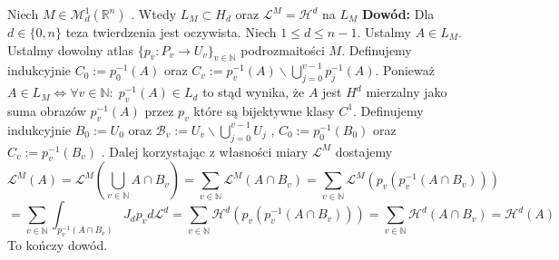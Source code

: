 \begin{tw}
	Niech $M \in \mathcal{M}^1_d(\mathbb{R}^n)$ . Wtedy $L_M \subset H_d$ oraz $\mathcal{L}^M = \mathcal{H}^d$ na $L_M$ 
	\newline\newline
	\textbf{Dowód:}\newline
	Dla $d \in \{0, n\}$ teza twierdzenia jest oczywista. Niech $1 \leq d \leq n -1$.
	Ustalmy $A \in L_M$. Ustalmy dowolny atlas $\{p_v: P_v \rightarrow U_v\}_{v \in \mathbb{N}}$ podrozmaitości $M$. Definujemy indukcyjnie $C_0:=p_0^{-1}(A)$ oraz $C_v := p_v^{-1}(A) \backslash \bigcup_{j=0}^{v-1} p_j^{-1}(A)$. Ponieważ $A \in L_M \Leftrightarrow \forall v \in \mathbb{N}: \; p_v^{-1}(A) \in L_d$ to stąd wynika, że $A$ jest $H^d$ mierzalny jako suma obrazów $p_v^{-1}(A)$ przez $p_v$ które są bijektywne klasy $C^1$. 
	Definujemy indukcyjnie $B_0:=U_0$ oraz $\mathcal{B}_v := U_v \backslash \bigcup_{j=0}^{v-1} U_j$ , $C_0:=p_0^{-1}(B_0)$ oraz $C_v := p_v^{-1}(B_v)$ .  Dalej korzystając z własności miary $\mathcal{L}^M$ dostajemy 
	$$
		\mathcal{L}^M(A) = \mathcal{L}^M(\bigcup_{v \in \mathbb{N}} A \cap B_v) 
		= \sum_{v \in \mathbb{N}} \mathcal{L}^M(A \cap B_v) 
		= \sum_{v \in \mathbb{N}} \mathcal{L}^M(p_v(p_v^{-1}(A \cap B_v))) 
	$$
	$$
		= \sum_{v \in \mathbb{N}} \int_{p_v^{-1}(A \cap B_v)} J_d p_v d \mathcal{L}^d
		= \sum_{v \in \mathbb{N}} \mathcal{H}^d(p_v(p_v^{-1}(A \cap B_v))) 
		= \sum_{v \in \mathbb{N}} \mathcal{H}^d(A \cap B_v) 
		= \mathcal{H}^d(A)
	$$
	To kończy dowód.
\end{tw}